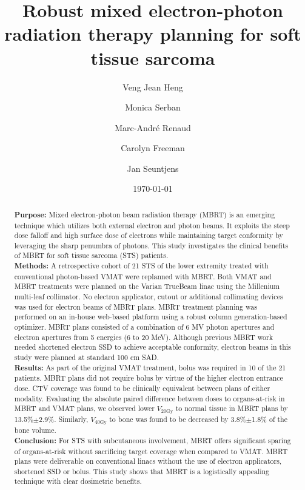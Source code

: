\documentclass[aapm,graphicx,superscriptaddress]{revtex4-1}
\begin{document}
\linenumbers

\title[Robust MBRT for soft tissue sarcoma]{Robust mixed electron-photon radiation therapy planning for soft tissue sarcoma}

\author{Veng Jean Heng}
\author{Monica Serban}
\author{Marc-Andr\'{e} Renaud}
\author{Carolyn Freeman}
\author{Jan Seuntjens}
\date{\today}

\begin{abstract}
\textbf{Purpose:}
Mixed electron-photon beam radiation therapy (MBRT) is an emerging technique which utilizes both external electron and photon beams. It exploits the steep dose falloff and high surface dose of electrons while maintaining target conformity by leveraging the sharp penumbra of photons. This study investigates the clinical benefits of MBRT for soft tissue sarcoma (STS) patients.\\
\textbf{Methods:}
A retrospective cohort of 21 STS of the lower extremity treated with conventional photon-based VMAT were replanned with MBRT. Both VMAT and MBRT treatments were planned on the Varian TrueBeam linac using the Millenium multi-leaf collimator. No electron applicator, cutout or additional collimating devices was used for electron beams of MBRT plans. MBRT treatment planning was performed on an in-house web-based platform using a robust column generation-based optimizer. MBRT plans consisted of a combination of 6 MV photon apertures and electron apertures from 5 energies (6 to 20 MeV). Although previous MBRT work needed shortened electron SSD to achieve acceptable conformity, electron beams in this study were planned at standard 100 cm SAD.\\
\textbf{Results:}
As part of the original VMAT treatment, bolus was required in 10 of the 21 patients. MBRT plans did not require bolus by virtue of the higher electron entrance dose. CTV coverage was found to be clinically equivalent between plans of either modality. Evaluating the absolute paired difference between doses to organs-at-risk in MBRT and VMAT plans, we observed lower $V_\text{20Gy}$ to normal tissue in MBRT plans by 13.5\%$\pm$2.9\%. Similarly, $V_\text{40Gy}$ to bone was found to be decreased by 3.8\%$\pm$1.8\% of the bone volume. \\
\textbf{Conclusion:}
For STS with subcutaneous involvement, MBRT offers significant sparing of organs-at-risk without sacrificing target coverage when compared to VMAT. MBRT plans were deliverable on conventional linacs without the use of electron applicators, shortened SSD or bolus. This study shows that MBRT is a logistically appealing technique with clear dosimetric benefits.
\end{abstract}
\end{document}
